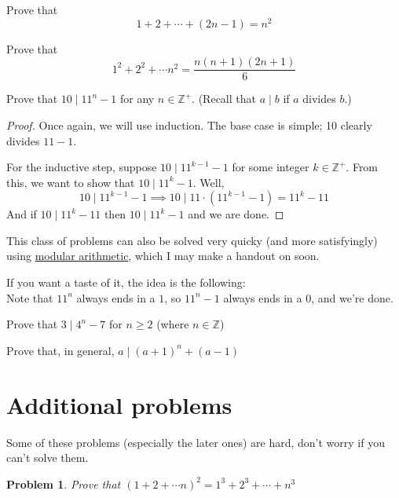 \documentclass[a4paper]{scrartcl}
\newtheorem{u_problem}{Problem}
\begin{document}
\begin{exercise}
	Prove that 	
	\[1 + 2 + \cdots + \left(2n-1\right) = n^2\]
\end{exercise}

\begin{exercise}
	Prove that
	\[1^2 + 2^2 + \cdots n^2 = \frac{n(n+1)(2n+1)}{6}\]
\end{exercise}


\begin{example}
	Prove that $10 \mid 11^n - 1$ for any $n \in \mathbb{Z}^+$. (Recall that $a \mid b$ if $a$ divides $b$.)
\end{example}
\begin{proof}
	Once again, we will use induction. The base case is simple; 10 clearly divides $11-1$.

	For the inductive step, suppose $10 \mid 11^{k-1} - 1$ for some integer $k \in \mathbb{Z}^+$. From this, we want to show that $10 \mid 11^k - 1$. Well,
	\[10 \mid 11^{k-1} - 1 \implies 10 \mid 11 \cdot (11^{k-1} - 1) = 11^k - 11 \]
	And if $10 \mid 11^k - 11$ then $10 \mid 11^k - 1$ and we are done.

\end{proof}
\begin{remark*}
	This class of problems can also be solved very quicky (and more satisfyingly) using \href{https://brilliant.org/wiki/modular-arithmetic/}{modular arithmetic}, which I may make a handout on soon.

	If you want a taste of it, the idea is the following: \\
	Note that $11^n$ always ends in a $1$, so $11^n - 1$ always ends in a 0, and we're done.
\end{remark*}

\begin{exercise}
	Prove that $3 \mid 4^{n} - 7$ for $n \geq 2$ (where $n \in \mathbb{Z}$)
\begin{exercise}
	Prove that, in general, $ a \mid {\left(a+1\right)}^n + \left(a-1\right)$
\end{exercise}
\end{exercise}


\section{Additional problems}
Some of these problems (especially the later ones) are hard, don't worry if you can't solve them.

\begin{u_problem}
	Prove that $(1 + 2 + \cdots n)^2 = 1^3 + 2^3 + \cdots + n^3$
\end{u_problem}
\end{document}
